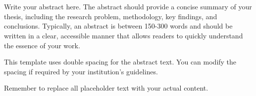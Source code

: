 
\begin{center}

\end{center}

\begin{center}
{{\bf\fontsize{14pt}{14.5pt}\selectfont {Abstract}}}
\end{center}

\doublespacing
{}



\begin{center}
	\begin{doublespace}
{\fontsize{14pt}{14.5pt}\selectfont {\thesisTitle}}\\
		{\fontsize{14pt}{14.5pt}\selectfont {\thesisAuthor}}\\
	\end{doublespace}
\end{center}

\setlength{\parindent}{0cm}
Write your abstract here. The abstract should provide a concise summary of your thesis, including the research problem, methodology, key findings, and conclusions. Typically, an abstract is between 150-300 words and should be written in a clear, accessible manner that allows readers to quickly understand the essence of your work.

This template uses double spacing for the abstract text. You can modify the spacing if required by your institution's guidelines.

Remember to replace all placeholder text with your actual content.
